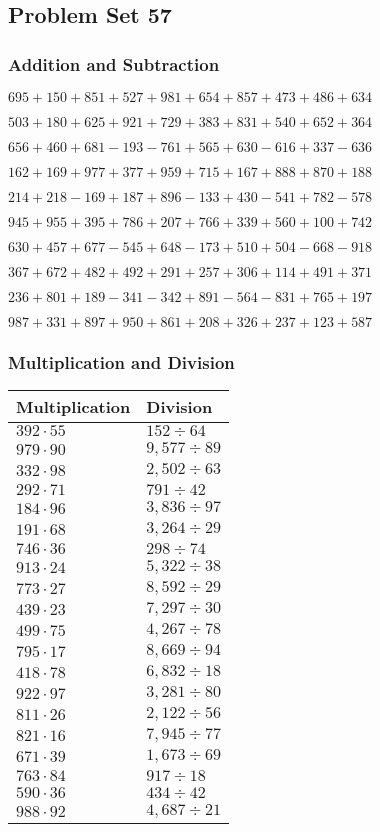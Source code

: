 \hypertarget{problem-set-57-1}{%
\subsection{Problem Set 57}\label{problem-set-57-1}}

\hypertarget{addition-and-subtraction-157}{%
\subsubsection{Addition and
Subtraction}\label{addition-and-subtraction-157}}

\(695 + 150 + 851 + 527 + 981 + 654 + 857 + 473 + 486 + 634\)

\(503 + 180 + 625 + 921 + 729 + 383 + 831 + 540 + 652 + 364\)

\(656 + 460 + 681 - 193 - 761 + 565 + 630 - 616 + 337 - 636\)

\(162 + 169 + 977 + 377 + 959 + 715 + 167 + 888 + 870 + 188\)

\(214 + 218 - 169 + 187 + 896 - 133 + 430 - 541 + 782 - 578\)

\(945 + 955 + 395 + 786 + 207 + 766 + 339 + 560 + 100 + 742\)

\(630 + 457 + 677 - 545 + 648 - 173 + 510 + 504 - 668 - 918\)

\(367 + 672 + 482 + 492 + 291 + 257 + 306 + 114 + 491 + 371\)

\(236 + 801 + 189 - 341 - 342 + 891 - 564 - 831 + 765 + 197\)

\(987 + 331 + 897 + 950 + 861 + 208 + 326 + 237 + 123 + 587\)

\hypertarget{multiplication-and-division-157}{%
\subsubsection{Multiplication and
Division}\label{multiplication-and-division-157}}

\begin{longtable}[]{@{}ll@{}}
\toprule
Multiplication & Division\tabularnewline
\midrule
\endhead
\(392 \cdot 55\) & \(152÷64\)\tabularnewline
\(979 \cdot 90\) & \(9,577÷89\)\tabularnewline
\(332 \cdot 98\) & \(2,502÷63\)\tabularnewline
\(292 \cdot 71\) & \(791÷42\)\tabularnewline
\(184 \cdot 96\) & \(3,836÷97\)\tabularnewline
\(191 \cdot 68\) & \(3,264÷29\)\tabularnewline
\(746 \cdot 36\) & \(298÷74\)\tabularnewline
\(913 \cdot 24\) & \(5,322÷38\)\tabularnewline
\(773 \cdot 27\) & \(8,592÷29\)\tabularnewline
\(439 \cdot 23\) & \(7,297÷30\)\tabularnewline
\(499 \cdot 75\) & \(4,267÷78\)\tabularnewline
\(795 \cdot 17\) & \(8,669÷94\)\tabularnewline
\(418 \cdot 78\) & \(6,832÷18\)\tabularnewline
\(922 \cdot 97\) & \(3,281÷80\)\tabularnewline
\(811 \cdot 26\) & \(2,122÷56\)\tabularnewline
\(821 \cdot 16\) & \(7,945÷77\)\tabularnewline
\(671 \cdot 39\) & \(1,673÷69\)\tabularnewline
\(763 \cdot 84\) & \(917÷18\)\tabularnewline
\(590 \cdot 36\) & \(434÷42\)\tabularnewline
\(988 \cdot 92\) & \(4,687÷21\)\tabularnewline
\bottomrule
\end{longtable}


